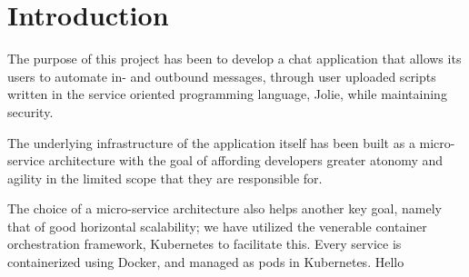
\section{Introduction}\label{sec:introduction}
The purpose of this project has been to develop a chat application that allows its users to automate in- and outbound messages,  through user uploaded scripts written in the service oriented programming language, Jolie, while maintaining security.

The underlying infrastructure of the application itself has been built as a micro-service architecture with the goal of affording developers greater atonomy and agility in the limited scope that they are responsible for.

The choice of a micro-service architecture also helps another key goal, namely that of good horizontal scalability; we have utilized the venerable container orchestration framework, Kubernetes to facilitate this. Every service is containerized using Docker, and managed as pods in Kubernetes.
Hello